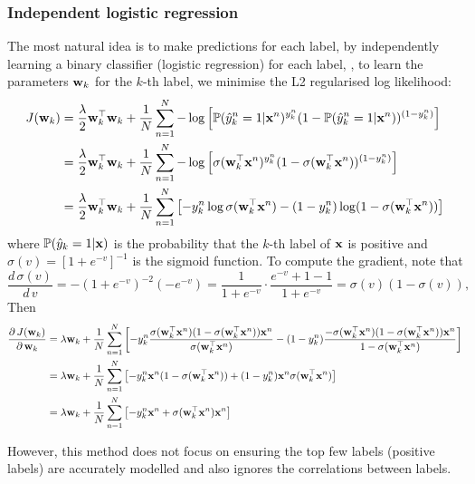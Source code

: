 \subsubsection{Independent logistic regression}
\label{sssec:logistic}
The most natural idea is to make predictions for each label, by independently learning a binary classifier (\eg logistic regression) for each label,
\ie, to learn the parameters $\mathbf{w}_k$ for the $k$-th label, we minimise the L2 regularised log likelihood:
\begin{align*}
J(\mathbf{w}_k) 
&= \frac{\lambda}{2} \mathbf{w}_k^\top \mathbf{w}_k + 
   \frac{1}{N} \sum_{n=1}^N -\log \left[ \mathbb{P}(\hat{y}_k^n = 1 | \mathbf{x}^n)^{y_k^n} (1 - \mathbb{P}(\hat{y}_k^n = 1 | \mathbf{x}^n))^{(1 - y_k^n)} \right] \\
&= \frac{\lambda}{2} \mathbf{w}_k^\top \mathbf{w}_k + 
   \frac{1}{N} \sum_{n=1}^N -\log \left[ \sigma(\mathbf{w}_k^\top \mathbf{x}^n)^{y_k^n} (1 - \sigma(\mathbf{w}_k^\top \mathbf{x}^n))^{(1 - y_k^n)} \right] \\
&= \frac{\lambda}{2} \mathbf{w}_k^\top \mathbf{w}_k + 
   \frac{1}{N} \sum_{n=1}^N \left[ -y_k^n \log \sigma(\mathbf{w}_k^\top \mathbf{x}^n) - (1 - y_k^n) \log (1 - \sigma(\mathbf{w}_k^\top \mathbf{x}^n)) \right]
\end{align*}
where $\mathbb{P}(\hat{y}_k = 1 |\mathbf{x})$ is the probability that the $k$-th label of $\mathbf{x}$ is positive and
$\sigma(v) = [1 + e^{-v}]^{-1}$ is the sigmoid function.
To compute the gradient, note that
$$
\frac{d \, \sigma(v)}{d \, v} = -(1 + e^{-v})^{-2} (-e^{-v}) = \frac{1}{1 + e^{-v}} \cdot \frac{e^{-v} + 1 - 1}{1 + e^{-v}} = \sigma(v) (1 - \sigma(v)),
$$
Then
\begin{align*}
\frac{\partial \, J(\mathbf{w}_k)} {\partial \, \mathbf{w}_k} 
&= \lambda \mathbf{w}_k + \frac{1}{N} \sum_{n=1}^N \left[ -y_k^n \frac{\sigma(\mathbf{w}_k^\top \mathbf{x}^n) (1 - \sigma(\mathbf{w}_k^\top \mathbf{x}^n)) \mathbf{x}^n} {\sigma(\mathbf{w}_k^\top \mathbf{x}^n)} -
   (1 - y_k^n) \frac{- \sigma(\mathbf{w}_k^\top \mathbf{x}^n) (1 - \sigma(\mathbf{w}_k^\top \mathbf{x}^n)) \mathbf{x}^n} {1 - \sigma(\mathbf{w}_k^\top \mathbf{x}^n)} \right] \\
&= \lambda \mathbf{w}_k + \frac{1}{N} \sum_{n=1}^N \left[ -y_k^n \mathbf{x}^n (1 - \sigma(\mathbf{w}_k^\top \mathbf{x}^n)) + (1 - y_k^n) \mathbf{x}^n \sigma(\mathbf{w}_k^\top \mathbf{x}^n) \right] \\
&= \lambda \mathbf{w}_k + \frac{1}{N} \sum_{n=1}^N \left[ -y_k^n \mathbf{x}^n + \sigma(\mathbf{w}_k^\top \mathbf{x}^n) \mathbf{x}^n \right]
\end{align*}

However, this method does not focus on ensuring the top few labels (\ie positive labels) are accurately modelled 
and also ignores the correlations between labels.



